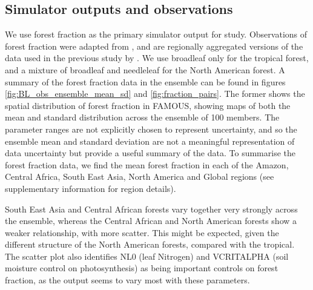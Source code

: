 \documentclass[esd, manuscript]{copernicus}
\begin{document}
\subsection{Simulator outputs and observations}\label{inputsoutputs}
We use forest fraction as the primary simulator output for study. Observations of forest fraction were adapted from \citep{loveland2000landcover}, and are regionally aggregated versions of the data used in the previous study by \citep{williams2013optimising}. We use broadleaf only for the tropical forest, and a mixture of broadleaf and needleleaf for the North American forest. A summary of the forest fraction data in the ensemble can be found in figures \ref{fig:BL_obs_ensemble_mean_sd} and \ref{fig:fraction_pairs}.  The former shows the spatial distribution of forest fraction in FAMOUS, showing maps of both the mean and standard distribution across the ensemble of 100 members. The parameter ranges are not explicitly chosen to represent uncertainty, and so the ensemble mean and standard deviation are not a meaningful representation of data uncertainty but provide a useful summary of the data. To summarise the forest fraction data, we find the mean forest fraction in each of the Amazon, Central Africa, South East Asia, North America and Global regions (see supplementary information for region details).





South East Asia and Central African forests vary together very strongly across the ensemble, whereas the Central African and North American forests show a weaker relationship, with more scatter. This might be expected, given the different structure of the North American forests, compared with the tropical. The scatter plot also identifies NL0 (leaf Nitrogen) and VCRITALPHA (soil moisture control on photosynthesis) as being important controls on forest fraction, as the output seems to vary most with these parameters.
\end{document}
